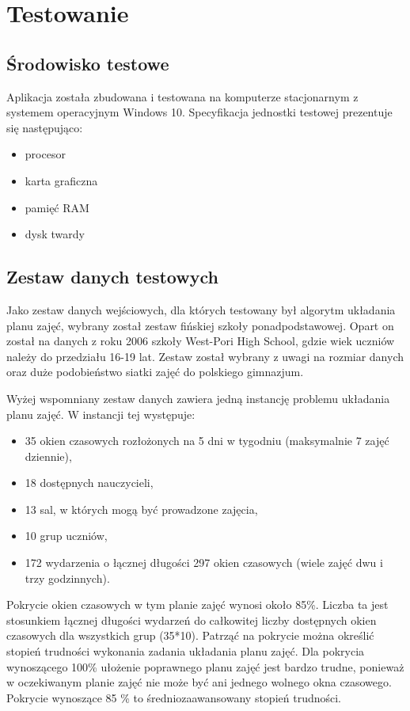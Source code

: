 \chapter{Testowanie}

\section{Środowisko testowe}

Aplikacja została zbudowana i testowana na komputerze stacjonarnym z systemem operacyjnym Windows 10. Specyfikacja jednostki testowej prezentuje się następująco:

\begin{itemize}
\item procesor 
\item karta graficzna
\item pamięć RAM
\item dysk twardy
\end{itemize}

\section{Zestaw danych testowych}

Jako zestaw danych wejściowych, dla których testowany był algorytm układania planu zajęć, wybrany został zestaw fińskiej szkoły ponadpodstawowej. Opart on został na danych z roku 2006 szkoły West-Pori High School, gdzie wiek uczniów należy do przedziału 16-19 lat. Zestaw został wybrany z uwagi na rozmiar danych oraz duże podobieństwo siatki zajęć do polskiego gimnazjum.

Wyżej wspomniany zestaw danych zawiera jedną instancję problemu układania planu zajęć. W instancji tej występuje:

\begin{itemize}
\item 35 okien czasowych rozłożonych na 5 dni w tygodniu (maksymalnie 7 zajęć dziennie),
\item 18 dostępnych nauczycieli,
\item 13 sal, w których mogą być prowadzone zajęcia,
\item 10 grup uczniów,
\item 172 wydarzenia o łącznej długości 297 okien czasowych (wiele zajęć dwu i trzy godzinnych).
\end{itemize}

Pokrycie okien czasowych w tym planie zajęć wynosi około 85\%. Liczba ta jest stosunkiem łącznej długości wydarzeń do całkowitej liczby dostępnych okien czasowych dla wszystkich grup (35*10). Patrząć na pokrycie można określić stopień trudności wykonania zadania układania planu zajęć. Dla pokrycia wynoszącego 100\% ułożenie poprawnego planu zajęć jest bardzo trudne, ponieważ w oczekiwanym planie zajęć nie może być ani jednego wolnego okna czasowego. Pokrycie wynoszące 85 \% to średniozaawansowany stopień trudności.

